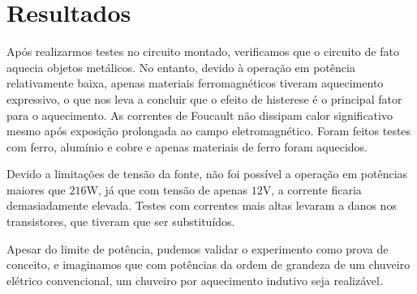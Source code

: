 \chapter{Resultados}
Após realizarmos testes no circuito montado, verificamos que o circuito de fato aquecia objetos metálicos. No entanto, devido à operação em potência relativamente baixa, apenas materiais ferromagnéticos tiveram aquecimento expressivo, o que nos leva a concluir que o efeito de histerese é o principal fator para o aquecimento. As correntes de Foucault não dissipam calor significativo mesmo após exposição prolongada ao campo eletromagnético. Foram feitos testes com ferro, alumínio e cobre e apenas materiais de ferro foram aquecidos.

Devido a limitações de tensão da fonte, não foi possível a operação em potências maiores que $216$W, já que com tensão de apenas $12$V, a corrente ficaria demasiadamente elevada. Testes com correntes mais altas levaram a danos nos transistores, que tiveram que ser substituídos.

Apesar do limite de potência, pudemos validar o experimento como prova de conceito, e imaginamos que com potências da ordem de grandeza de um chuveiro elétrico convencional, um chuveiro por aquecimento indutivo seja realizável.